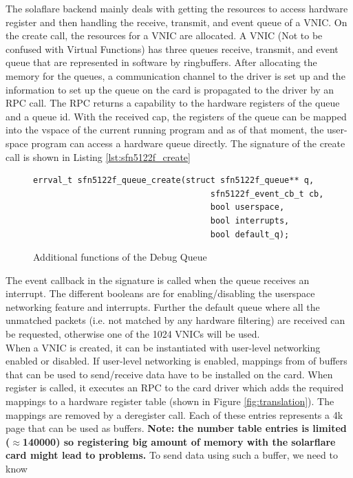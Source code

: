 \documentclass[a4paper,11pt,twoside]{report}
\begin{document}
The solaflare backend mainly deals with getting the resources to access hardware register and
then handling the receive, transmit, and event queue of a VNIC. On the create call, the resources for a VNIC are allocated. 
A VNIC (Not to be confused with Virtual Functions) has three queues receive, transmit, and event queue that are represented 
in software by ringbuffers. After allocating the memory for the queues, a communication 
channel to the driver is set up and the information to set up the queue on the card is 
propagated to the driver by an RPC call. The RPC returns a capability to the hardware registers 
of the queue and a queue id. With the received cap, 
the registers of the queue can be mapped into the vspace of the current running program and as 
of that moment, the user-space program can access a hardware queue directly. The signature of the 
create call is shown in Listing \ref{lst:sfn5122f_create}
\begin{figure}[h]
	\caption{Additional functions of the Debug Queue}
	\centering
	\begin{lstlisting}[style=code]
     errval_t sfn5122f_queue_create(struct sfn5122f_queue** q, 
                                    sfn5122f_event_cb_t cb,
                                    bool userspace, 
                                    bool interrupts, 
                                    bool default_q);
	\end{lstlisting}
	\label{lst:debug}
\end{figure} 
The event callback in the signature is called when the queue receives an interrupt. The different
booleans are for enabling/disabling the userspace networking feature and interrupts. Further
the default queue where all the unmatched packets (i.e. not matched by any hardware filtering)
are received can be requested, otherwise one of the 1024 VNICs will be used.
\\
When a VNIC is created, it can be instantiated with user-level networking enabled or disabled. 
If user-level networking is enabled, mappings from of buffers that can be used to send/receive
data have to be installed on the card. When register is called, it executes an RPC to 
the card driver which adds the required mappings to a hardware register table 
(shown in Figure \ref{fig:translation}). The mappings are removed by a deregister call. Each of these
entries represents a 4k page that can be used as buffers. \textbf{Note: the number 
table entries is limited ($\approx$140000) so registering big amount of memory with
the solarflare card might lead to problems.} To send data using such a buffer, we need to know
\end{document}
